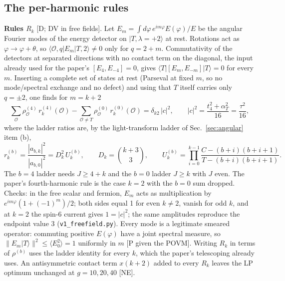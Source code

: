 \subsection{The per-harmonic rules}
\label{sec:allk-rules}
\textbf{Rules $R_k$} [D; DV in free fields]. Let $E_m=\int d\varphi\,e^{im\varphi}E(\varphi)/E$ be the angular Fourier modes of the energy detector
on $|T,\lambda{=}{+}2\rangle$ at rest. Rotations act as $\varphi\to\varphi+\theta$, so $\langle\mathcal O,q|E_m|T,2\rangle\neq0$ only for $q=2+m$. Commutativity
of the detectors at separated directions with no contact term on the diagonal, the input already used for the paper's $[E_4,E_{-4}]=0$,
gives $\langle T|[E_m,E_{-m}]|T\rangle=0$ for every $m$. Inserting a complete set of states at rest (Parseval at fixed $m$, so no
mode/spectral exchange and no defect) and using that $T$ itself carries only $q=\pm2$, one finds for $m=k+2$
\begin{equation}
\sum_{\mathcal O}\rho^{(4)}_{\mathcal O}\,r^{(4)}_k(\mathcal O)-\sum_{\mathcal O\neq T}\rho^{(0)}_{\mathcal O}\,r^{(0)}_k(\mathcal O)=\delta_{k2}\,|c|^2,\qquad
|c|^2=\frac{t_4^2+\alpha_T^2}{16}=\frac{\tau^2}{16},
\label{eq:allk-Rk}
\end{equation}
where the ladder ratios are, by the light-transform ladder of Sec.~\ref{sec:angular} item (b),
\begin{equation}
r^{(b)}_k=\frac{|a_{b,k}|^2}{|a_{b,0}|^2}=D_k^2\,U^{(b)}_k,\qquad D_k=\binom{k+3}3,\qquad
U^{(b)}_k=\prod_{i=0}^{k-1}\frac{C-(b+i)(b+i+1)}{T-(b+i)(b+i+1)} .
\label{eq:allk-ladder}
\end{equation}
The $b=4$ ladder needs $J\ge4+k$ and the $b=0$ ladder $J\ge k$ with $J$ even. The paper's fourth-harmonic rule is the case $k=2$ with the
$b=0$ sum dropped. Checks: in the free scalar and fermion, $E_m$ acts as multiplication by $e^{im\varphi}(1+(-1)^m)/2$; both sides equal 1
for even $k\neq2$, vanish for odd $k$, and at $k=2$ the spin-6 current gives $1=|c|^2$; the same amplitudes reproduce the endpoint value
$3$ (\texttt{v1\_freefield.py}). Every mode is a legitimate smeared operator: commuting positive $E(\varphi)$ have a joint spectral measure,
so $\|E_m|T\rangle\|^2\le\langle E_0^2\rangle=1$ uniformly in $m$ [P given the POVM]. Writing $R_k$ in terms of $\rho^{(b)}$ uses the ladder
identity for every $k$, which the paper's telescoping already uses. An antisymmetric contact term $x(k+2)$ added to every $R_k$ leaves the
LP optimum unchanged at $g=10,20,40$ [NE].

